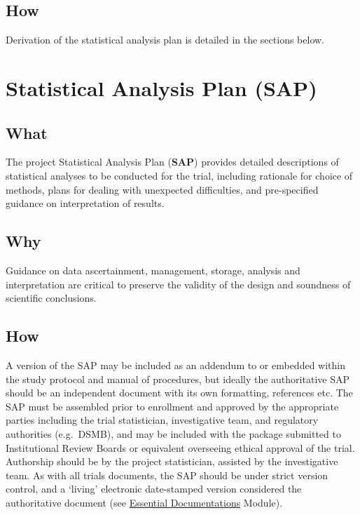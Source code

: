 \documentclass[]{book}
\theoremstyle{definition}
\theoremstyle{definition}
\theoremstyle{definition}
\theoremstyle{remark}
\begin{document}
\subsection{How}\label{how-2}

Derivation of the statistical analysis plan is detailed in the sections
below.

\section{Statistical Analysis Plan
(SAP)}\label{statistical-analysis-plan-sap}

\subsection{What}\label{what-3}

The project Statistical Analysis Plan (\textbf{SAP}) provides detailed
descriptions of statistical analyses to be conducted for the trial,
including rationale for choice of methods, plans for dealing with
unexpected difficulties, and pre-specified guidance on interpretation of
results.

\subsection{Why}\label{why-3}

Guidance on data ascertainment, management, storage, analysis and
interpretation are critical to preserve the validity of the design and
soundness of scientific conclusions.

\subsection{How}\label{how-3}

A version of the SAP may be included as an addendum to or embedded
within the study protocol and manual of procedures, but ideally the
authoritative SAP should be an independent document with its own
formatting, references etc. The SAP must be assembled prior to
enrollment and approved by the appropriate parties including the trial
statistician, investigative team, and regulatory authorities
(e.g.~DSMB), and may be included with the package submitted to
Institutional Review Boards or equivalent overseeing ethical approval of
the trial. Authorship should be by the project statistician, assisted by
the investigative team. As with all trials documents, the SAP should be
under strict version control, and a `living' electronic date-stamped
version considered the authoritative document (see
\href{https://ifar-isac.github.io/book/essential-documentations.html}{Essential
Documentations} Module).
\end{document}
